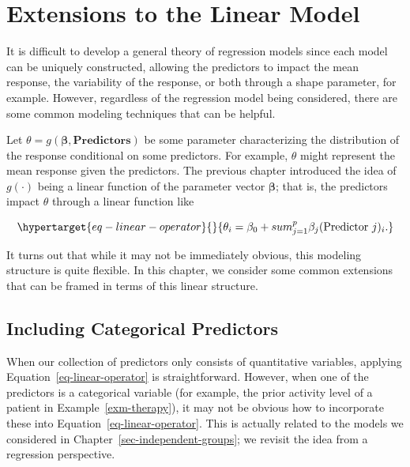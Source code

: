 \documentclass[
  letterpaper,
  DIV=11,
  numbers=noendperiod]{scrreprt}
\theoremstyle{definition}
\theoremstyle{plain}
\theoremstyle{definition}
\theoremstyle{remark}
\begin{document}
\hypertarget{sec-reg-extensions}{%
\chapter{Extensions to the Linear Model}\label{sec-reg-extensions}}

\providecommand{\norm}[1]{\lVert#1\rVert}
\providecommand{\abs}[1]{\lvert#1\rvert}
\providecommand{\iid}{\stackrel{\text{IID}}{\sim}}
\providecommand{\ind}{\stackrel{\text{Ind}}{\sim}}

\providecommand{\bm}[1]{\mathbf{#1}}
\providecommand{\bs}[1]{\boldsymbol{#1}}
\providecommand{\bbeta}{\bs{\beta}}

\providecommand{\Ell}{\mathcal{L}}
\providecommand{\indep}{\perp\negthickspace\negmedspace\perp}

It is difficult to develop a general theory of regression models since
each model can be uniquely constructed, allowing the predictors to
impact the mean response, the variability of the response, or both
through a shape parameter, for example. However, regardless of the
regression model being considered, there are some common modeling
techniques that can be helpful.

Let \(\theta = g\left(\boldsymbol{\beta}, \mathbf{Predictors}\right)\)
be some parameter characterizing the distribution of the response
conditional on some predictors. For example, \(\theta\) might represent
the mean response given the predictors. The previous chapter introduced
the idea of \(g(\cdot)\) being a linear function of the parameter vector
\(\boldsymbol{\beta}\); that is, the predictors impact \(\theta\)
through a linear function like

\begin{equation}\protect\hypertarget{eq-linear-operator}{}{\theta_i = \beta_0 + sum_{j=1}^{p} \beta_j (\text{Predictor } j)_i.}\label{eq-linear-operator}\end{equation}

It turns out that while it may not be immediately obvious, this modeling
structure is quite flexible. In this chapter, we consider some common
extensions that can be framed in terms of this linear structure.

\hypertarget{including-categorical-predictors}{%
\section{Including Categorical
Predictors}\label{including-categorical-predictors}}

When our collection of predictors only consists of quantitative
variables, applying Equation~\ref{eq-linear-operator} is
straightforward. However, when one of the predictors is a categorical
variable (for example, the prior activity level of a patient in
Example~\ref{exm-therapy}), it may not be obvious how to incorporate
these into Equation~\ref{eq-linear-operator}. This is actually related
to the models we considered in Chapter~\ref{sec-independent-groups}; we
revisit the idea from a regression perspective.
\end{document}
